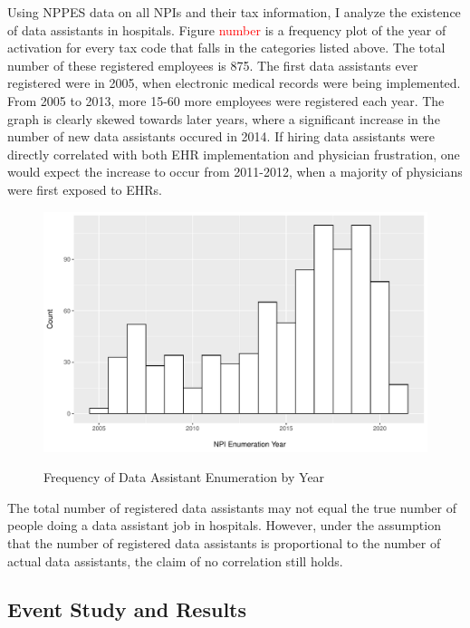 \documentclass[11pt]{article}
\begin{document}
Using NPPES data on all NPIs and their tax information, I analyze the existence of data assistants in hospitals. Figure \textcolor{red}{number} is a frequency plot of the year of activation for every tax code that falls in the categories listed above. The total number of these registered employees is 875. The first data assistants ever registered were in 2005, when electronic medical records were being implemented. From 2005 to 2013, more 15-60 more employees were registered each year. The graph is clearly skewed towards later years, where a significant increase in the number of new data assistants occured in 2014. If hiring data assistants were directly correlated with both EHR implementation and physician frustration, one would expect the increase to occur from 2011-2012, when a majority of physicians were first exposed to EHRs. 


\vspace{5mm}
\begin{figure}[ht]
\caption{Frequency of Data Assistant Enumeration by Year}
    \includegraphics[scale=.5]{Objects/dataassistant_histogram.pdf}
    \label{fig:dataassistant_histogram}
\end{figure}

The total number of registered data assistants may not equal the true number of people doing a data assistant job in hospitals. However, under the assumption that the number of registered data assistants is proportional to the number of actual data assistants, the claim of no correlation still holds. 


\subsection{Event Study and Results}
\end{document}
